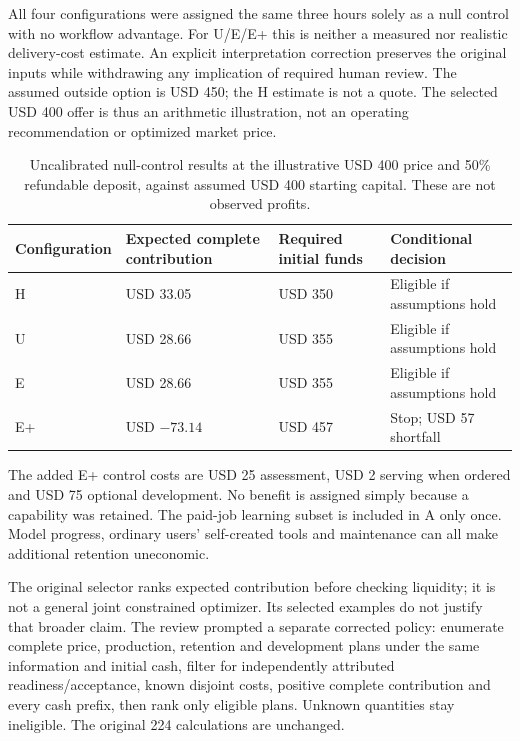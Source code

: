 \documentclass[11pt]{article}
\begin{document}
All four configurations were assigned the same three hours solely as a null control with no workflow advantage. For U/E/E+ this is neither a measured nor realistic delivery-cost estimate. An explicit interpretation correction preserves the original inputs while withdrawing any implication of required human review. The assumed outside option is USD 450; the H estimate is not a quote. The selected USD 400 offer is thus an arithmetic illustration, not an operating recommendation or optimized market price.

\begin{table}[H]
\centering
\small
\begin{tabularx}{\textwidth}{@{}lYYY@{}}
\toprule
Configuration & Expected complete contribution & Required initial funds & Conditional decision\\\midrule
H & USD 33.05 & USD 350 & Eligible if assumptions hold\\
U & USD 28.66 & USD 355 & Eligible if assumptions hold\\
E & USD 28.66 & USD 355 & Eligible if assumptions hold\\
E+ & USD $-73.14$ & USD 457 & Stop; USD 57 shortfall\\
\bottomrule
\end{tabularx}
\caption{Uncalibrated null-control results at the illustrative USD 400 price and 50\% refundable deposit, against assumed USD 400 starting capital. These are not observed profits.}
\end{table}

The added E+ control costs are USD 25 assessment, USD 2 serving when ordered and USD 75 optional development. No benefit is assigned simply because a capability was retained. The paid-job learning subset is included in A only once. Model progress, ordinary users' self-created tools and maintenance can all make additional retention uneconomic.

The original selector ranks expected contribution before checking liquidity; it is not a general joint constrained optimizer. Its selected examples do not justify that broader claim. The review prompted a separate corrected policy: enumerate complete price, production, retention and development plans under the same information and initial cash, filter for independently attributed readiness/acceptance, known disjoint costs, positive complete contribution and every cash prefix, then rank only eligible plans. Unknown quantities stay ineligible. The original 224 calculations are unchanged.
\end{document}
